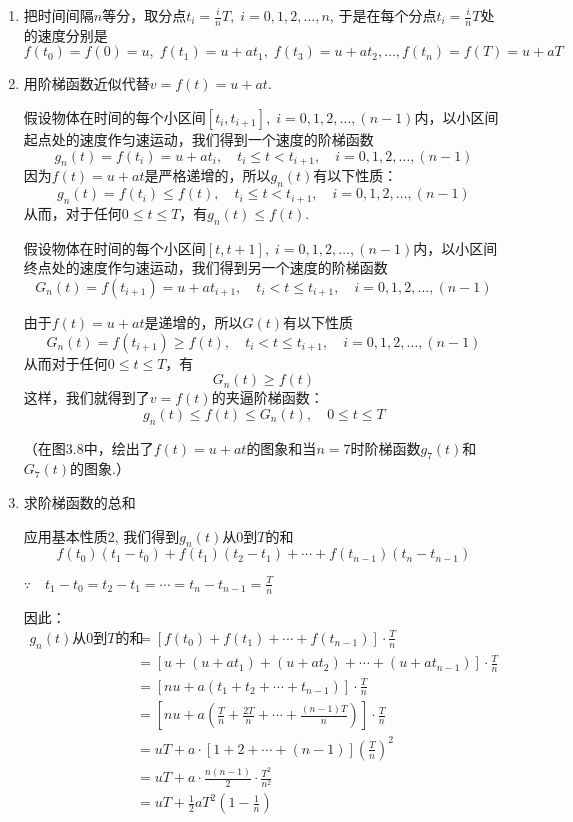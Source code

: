 \begin{solution}
\begin{enumerate}
    \item 把时间间隔$n$等分，取分点$t_i=\frac{i}{n}T,\; i=0,1, 2,\ldots,n$, 于是在每个分点$t_i=\frac{i}{n}T$处的速度分别是
\[f (t_0) =f (0) =u,\;  f(t_1) =u+at_1,\; f (t_3) =u+at_2,\ldots,f (t_n) =f (T) =u+aT\]
\item 用阶梯函数近似代替$v=f(t)=u+at$. 

假设物体在时间的每个小区间$[t_i,t_{i+1}],\; i=0,1, 2,\ldots,(n-1)$内，以小区间起点处的速度作匀速运动，我们得到一个速度的阶梯函数
\[g_n (t)=f(t_i)=u+at_i,\quad t_i\le t<t_{i+1},\quad i=0,1,2,\ldots,(n-1)\]
因为$f(t)=u+at$是严格递增的，所以$g_n(t)$有以下性质：
\[g_n (t)=f(t_i)\le f(t),\quad t_i\le t<t_{i+1},\quad i=0,1,2,\ldots,(n-1)\]
从而，对于任何$0\le t\le T$，有$g_n(t)\le f(t)$.

假设物体在时间的每个小区间$[t,t+1],\; i=0,1, 2,\ldots,(n-1)$内，以小区间终点处的速度作匀速运动，我们得到另一个速度的阶梯函数
\[G_n(t)=f(t_{i+1})=u+at_{i+1},\quad t_i< t\le t_{i+1},\quad i=0,1,2,\ldots,(n-1)\]

由于$f(t)=u+at$是递增的，所以$G(t)$有以下性质
\[G_n (t)=f(t_{i+1})\ge f(t),\quad t_i< t\le t_{i+1},\quad i=0,1,2,\ldots,(n-1)\]
从而对于任何$0\le t\le T$，有
\[G_n(t)\ge f(t)\]
这样，我们就得到了$v=f(t)$的夹逼阶梯函数：
\[ g_n(t) \le f (t) \le G_n (t),\quad 0\le t\le T\]

（在图3.8中，绘出了$f(t)=u+at$的图象和当$n=7$时阶梯函数$g_7(t)$和$G_7(t)$的图象.）

\item 求阶梯函数的总和

应用基本性质2, 我们得到$g_n(t)$从0到$T$的和
\[f(t_0)(t_1-t_0)+f(t_1)(t_2-t_1)+\cdots+f (t_{n-1}) (t_n-t_{n-1})\]

$\because\quad t_1-t_0=t_2-t_1=\cdots=t_n-t_{n-1}=\frac{T}{n}$

因此：
\[\begin{split}
\text{$g_n(t)$从0到$T$的和}&=\left[f(t_0)+f(t_1)+\cdots+f(t_{n-1})\right]\cdot \frac{T}{n}\\
&=\left[u+(u+at_1)+(u+at_2)+\cdots +(u+at_{n-1})\right]\cdot \frac{T}{n}\\
&=\left[nu+a(t_1+t_2+\cdots+t_{n-1})\right]\cdot \frac{T}{n}\\
&=\left[nu+a\left(\frac{T}{n}+\frac{2T}{n}+\cdots+\frac{(n-1)T}{n}\right)\right]\cdot \frac{T}{n}\\
&=uT+a\cdot [1+2+\cdots+(n-1)]\left(\frac{T}{n}\right)^2\\
&=uT+a\cdot \frac{n(n-1)}{2}\cdot \frac{T^2}{n^2}\\
&=uT+\frac{1}{2}aT^2\left(1-\frac{1}{n}\right)
\end{split}\]


\end{enumerate}
\end{solution}
